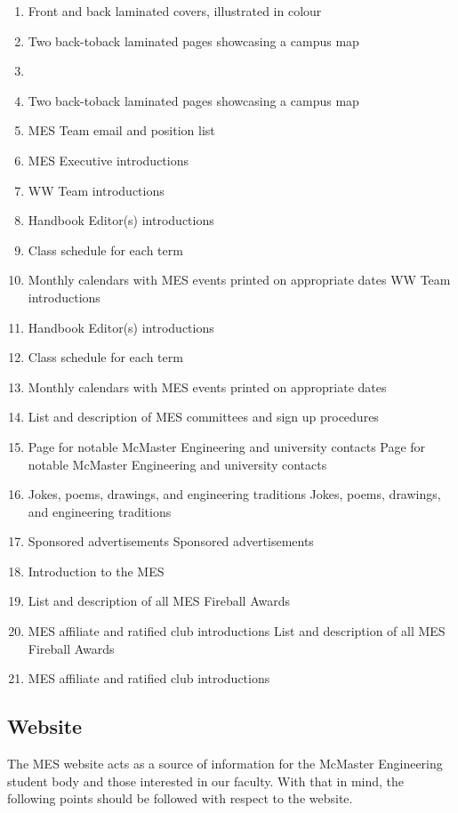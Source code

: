 \begin{enumerate}
  \begin{enumerate}
   \item
    Front and back laminated covers, illustrated in colour
   \item
    Two back-toback laminated pages showcasing a campus map 
   \item     
   \item
    Two back-toback laminated pages showcasing a campus map 
   \item     
    MES Team email and position list
   \item
    MES Executive introductions
   \item
    WW Team introductions 
   \item    
    Handbook Editor(s) introductions   
   \item    
    Class schedule for each term
   \item
    Monthly calendars with MES events printed on appropriate dates
    WW Team introductions 
   \item    
    Handbook Editor(s) introductions   
   \item    
    Class schedule for each term
   \item
    Monthly calendars with MES events printed on appropriate dates
   \item
    List and description of MES committees and sign up procedures
   \item
    Page for notable McMaster Engineering and university contacts 
    Page for notable McMaster Engineering and university contacts 
   \item
    Jokes, poems, drawings, and engineering traditions
    Jokes, poems, drawings, and engineering traditions
   \item
    Sponsored advertisements
    Sponsored advertisements
   \item
    Introduction to the MES
   \item
    List and description of all MES Fireball Awards
   \item    
    MES affiliate and ratified club introductions 
    List and description of all MES Fireball Awards
   \item    
    MES affiliate and ratified club introductions 
  \end{enumerate}
\end{enumerate}

\subsection{Website}
\label{website}
The MES website acts as a source of information for the McMaster
Engineering student body and those interested in our faculty. With that
in mind, the following points should be followed with respect to the
website.

